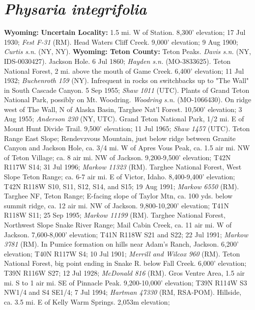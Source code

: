 \section*{\textit{Physaria integrifolia}}

  \textbf{Wyoming:}
  \textbf{Uncertain Locality:}
1.5 mi. W of Station. 8,300' elevation; 17 Jul 1930; \textit{Fest F-31} (RM).
Head Waters Cliff Creek. 9,000' elevation; 9 Aug 1900;
\textit{Curtis s.n.} (NY, NY).
  \textbf{Wyoming: Teton County:}
Teton Peaks. \textit{Davis s.n.} (NY, IDS-0030427).
Jackson Hole. 6 Jul 1860; \textit{Hayden s.n.} (MO-3833625).
Teton National Forest, 2 mi. above the mouth of Game Creek. 6,400' elevation;
11 Jul 1932; \textit{Buchenroth 159} (NY).
Infrequent in rocks on switchbacks up to "The Wall" in South Cascade Canyon.
5 Sep 1955; \textit{Shaw 1011} (UTC).
Plants of Grand Teton National Park, possibly on Mt. Woodring.
\textit{Woodring s.n.} (MO-1066430).
On ridge west of The Wall, N of Alaska Basin, Targhee Nat'l Forest.
10,500' elevation; 3 Aug 1955; \textit{Anderson 230} (NY, UTC).
Grand Teton National Park, 1/2 mi. E of Mount Hunt Divide Trail.
9,500' elevation; 11 Jul 1965; \textit{Shaw 1457} (UTC).
Teton Range East Slope; Rendevzvous Mountain, just below ridge between
Granite Canyon and Jackson Hole, ca. 3/4 mi. W of Apres Vous Peak, ca. 1.5 air
mi. NW of Teton Village; ca. 8 air mi. NW of Jackson. 9,200-9,500' elevation;
T42N R117W S14; 31 Jul 1996; \textit{Markow 11323} (RM).
Targhee National Forest, West Slope Teton Range; ca. 6-7 air mi. E of Victor,
Idaho. 8,400-9,400' elevation; T42N R118W S10, S11, S12, S14, and S15;
19 Aug 1991; \textit{Markow 6550} (RM).
Targhee NF, Teton Range; E-facing slope of Taylor Mtn, ca. 100 yds. below
summit ridge, ca. 12 air mi. NW of Jackson. 9,800-10,200' elevation;
T41N R118W S11; 25 Sep 1995; \textit{Markow 11199} (RM).
Targhee National Forest, Northwest Slope Snake River Range; Mail Cabin Creek,
ca. 11 air mi. W of Jackson. 7,600-8,000’ elevation; T41N R118W S21 and S22;
22 Jul 1991; \textit{Markow 3781} (RM).
In Pumice formation on hills near Adam's Ranch, Jackson. 6,200' elevation;
T40N R117W S4; 10 Jul 1901; \textit{Merrill and Wilcox 960} (RM).
Teton National Forest, big point ending in Snake R. below Fall Creek.
6,000' elevation; T39N R116W S27; 12 Jul 1928; \textit{McDonald 816} (RM).
Gros Ventre Area, 1.5 air mi. S to 1 air mi. SE of Pinnacle Peak.
9,200-10,000' elevation; T39N R114W S3 NW1/4 and S4 SE1/4; 7 Jul 1994;
\textit{Hartman 47330} (RM, RSA-POM).
Hillside, ca. 3.5 mi. E of Kelly Warm Springs. 2,053m elevation;
